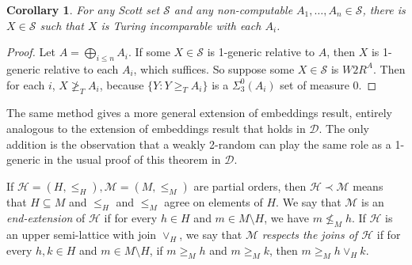 \documentclass{amsart}
\newtheorem{cor}{Corollary}
\newcommand{\cS}{\mathcal S}
\newcommand{\cH}{\mathcal H}
\newcommand{\cM}{\mathcal M}
\begin{document}
\begin{cor}\label{thm4}
  For any Scott set $\cS$ and any non-computable
  $A_1,\dots, A_n \in \cS$, there is $X \in \cS$
  such that $X$ is Turing incomparable with each $A_i$.
\end{cor}
\begin{proof}
  Let $A = \bigoplus_{i\leq n} A_i$.
  If some $X \in \cS$ is 1-generic relative to $A$,
  then $X$ is 1-generic relative to each $A_i$, which suffices.
  So suppose some $X\in \cS$ is $W2R^A$. Then for each $i$, 
$X \not\geq_T A_i$, because $\{ Y : Y \geq_T A_i\}$ 
is a $\Sigma^0_3(A_i)$ set of measure 0.
\end{proof}

The same method gives a more general extension of embeddings result, 
entirely analogous to the extension of embeddings result that holds 
in $\mathcal D$.  The only addition is the observation that 
a weakly 2-random can play the same role as a 1-generic in the 
usual proof of this theorem in $\mathcal D$.

If $\cH = (H,\leq_H), \cM = (M,\leq_M)$ are partial orders, 
then $\cH \prec \cM$ means that $H\subseteq M$ and $\leq_H$ and $\leq_M$ 
agree on elements of $H$.  We say that 
$\cM$ is an \emph{end-extension} of $\cH$ if for every $h \in H$ and 
$m \in M \setminus H$, we have $m \not\leq_M h$.  If $\cH$ is an 
upper semi-lattice with join $\vee_H$, we say that $\cM$ 
\emph{respects the joins of $\cH$} if for every $h,k \in H$ and 
$m \in M\setminus H$, if $m \geq_M h$ and $m\geq_M k$, then 
$m \geq_M h \vee_H k$.
\end{document}
